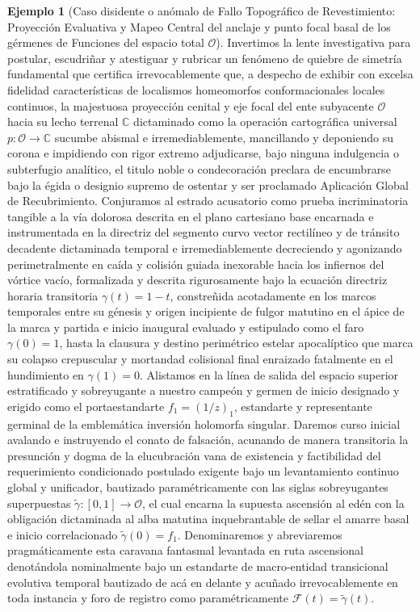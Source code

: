 \documentclass[11pt,a4paper]{article}
\theoremstyle{definition}
\newtheorem{ejemplo}{Ejemplo}[section]
\theoremstyle{remark}
\numberwithin{equation}{section}
\begin{document}
\begin{ejemplo}[Caso disidente o anómalo de Fallo Topográfico de Revestimiento: Proyección Evaluativa y Mapeo Central del anclaje y punto focal basal de los gérmenes de Funciones del espacio total $\mathcal{O}$]
Invertimos la lente investigativa para postular, escudriñar y atestiguar y rubricar un fenómeno de quiebre de simetría fundamental que certifica irrevocablemente que, a despecho de exhibir con excelsa fidelidad características de localismos homeomorfos conformacionales locales continuos, la majestuosa proyección cenital y eje focal del ente subyacente $\mathcal{O}$ hacia su lecho terrenal $\mathbb{C}$ dictaminado como la operación cartográfica universal $p: \mathcal{O} \to \mathbb{C}$ sucumbe abismal e irremediablemente, mancillando y deponiendo su corona e impidiendo con rigor extremo adjudicarse, bajo ninguna indulgencia o subterfugio analítico, el titulo noble o condecoración preclara de encumbrarse bajo la égida o designio supremo de ostentar y ser proclamado Aplicación Global de Recubrimiento.
Conjuramos al estrado acusatorio como prueba incriminatoria tangible a la vía dolorosa descrita en el plano cartesiano base encarnada e instrumentada en la directriz del segmento curvo vector rectilíneo y de tránsito decadente dictaminada temporal e irremediablemente decreciendo y agonizando perimetralmente en caída y colisión guiada inexorable hacia los infiernos del vórtice vacío, formalizada y descrita rigurosamente bajo la ecuación directriz horaria transitoria $\gamma(t) = 1 - t$, constreñida acotadamente en los marcos temporales entre su génesis y origen incipiente de fulgor matutino en el ápice de la marca y partida e inicio inaugural evaluado y estipulado como el faro $\gamma(0) = 1$, hasta la clausura y destino perimétrico estelar apocalíptico que marca su colapso crepuscular y mortandad colisional final enraizado fatalmente en el hundimiento en $\gamma(1) = 0$.
Alistamos en la línea de salida del espacio superior estratificado y sobreyugante a nuestro campeón y germen de inicio designado y erigido como el portaestandarte $f_1 = (1/z)_1$, estandarte y representante germinal de la emblemática inversión holomorfa singular.
Daremos curso inicial avalando e instruyendo el conato de falsación, acunando de manera transitoria la presunción y dogma de la elucubración vana de existencia y factibilidad del requerimiento condicionado postulado exigente bajo un levantamiento continuo global y unificador, bautizado paramétricamente con las siglas sobreyugantes superpuestas $\widetilde{\gamma}: [0, 1] \to \mathcal{O}$, el cual encarna la supuesta ascensión al edén con la obligación dictaminada al alba matutina inquebrantable de sellar el amarre basal e inicio correlacionado $\widetilde{\gamma}(0) = f_1$. Denominaremos y abreviaremos pragmáticamente esta caravana fantasmal levantada en ruta ascensional denotándola nominalmente bajo un estandarte de macro-entidad transicional evolutiva temporal bautizado de acá en delante y acuñado irrevocablemente en toda instancia y foro de registro como paramétricamente $\mathcal{F}(t) = \widetilde{\gamma}(t)$.

\end{ejemplo}
\end{document}
